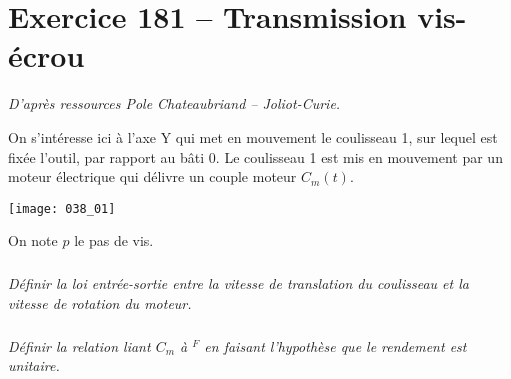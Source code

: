 \section*{Exercice 181 -- Transmission vis-écrou}
\setcounter{exo}{0}

\textit{D'après ressources Pole Chateaubriand -- Joliot-Curie.}

On s’intéresse ici à l’axe Y qui met en mouvement le coulisseau 1,
sur lequel est fixée l’outil, par rapport au bâti 0. Le coulisseau 1 est mis en mouvement par un moteur
électrique qui délivre un couple moteur $C_m(t)$.

\begin{center}
\texttt{[image: 038\_01]}
\end{center}

On note $p$ le pas de vis. 


\subparagraph{}
\textit{Définir la loi entrée-sortie entre la vitesse de translation du coulisseau et la vitesse de rotation du moteur. }
\ifprof
\begin{corrige}
\end{corrige}
\else
\fi

\subparagraph{}
\textit{Définir la relation liant $C_m$ à $^F$ en faisant l'hypothèse que le rendement est unitaire. }
\ifprof
\begin{corrige}
\end{corrige}
\else
\fi